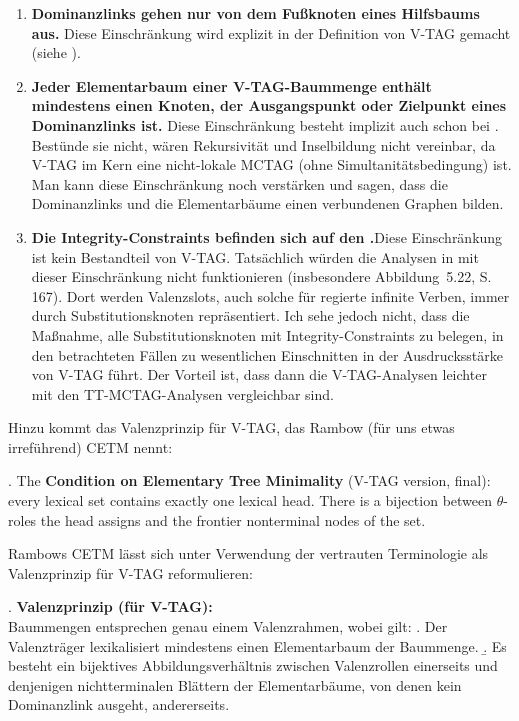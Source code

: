 \begin{enumerate}
  \item {\bf Dominanzlinks gehen nur von dem Fu\ss knoten eines Hilfsbaums aus.} Diese Einschränkung wird explizit in der Definition von V-TAG gemacht (siehe \citealt[Def.~21]{Rambow:94}).
  \item  {\bf Jeder Elementarbaum einer V-TAG-Baummenge enthält mindestens einen Knoten, der Ausgangspunkt oder Zielpunkt eines Dominanzlinks ist.} Diese Einschränkung besteht implizit auch schon bei \cite{Rambow:94}. Bestünde sie nicht, wären  Rekursivität und Inselbildung nicht vereinbar, da V-TAG im Kern eine nicht-lokale MCTAG (ohne Simultanitätsbedingung) ist. Man kann diese Einschränkung noch verstärken und sagen, dass die Dominanzlinks und die Elementarbäume einen verbundenen Graphen bilden.  
  \item {\bf Die Integrity-Constraints befinden sich auf den .}\linebreak Diese Einschränkung ist kein Bestandteil von V-TAG. Tatsächlich würden die Analysen in \cite{Rambow:94} mit dieser Einschränkung nicht funktionieren (insbesondere Abbildung~5.22, S.\,167). Dort werden Valenzslots, auch solche für regierte infinite Verben, immer durch Substitutionsknoten repräsentiert. Ich sehe jedoch nicht, dass die Maßnahme, alle Substitutionsknoten mit Integrity-Constraints zu belegen, in den betrachteten Fällen zu wesentlichen Einschnitten in der Ausdrucksstärke von V-TAG führt. Der Vorteil ist, dass dann die V-TAG-Analysen leichter mit den TT-MCTAG-Analysen vergleichbar sind. 
\end{enumerate}     
Hinzu kommt das Valenzprinzip für V-TAG, das Rambow (für uns etwas irreführend) CETM nennt:    

\ex. The {\bf Condition on Elementary Tree Minimality} (V-TAG version, final): every lexical set contains exactly one lexical head. There is a bijection between $\theta$-roles the head assigns and the frontier nonterminal nodes of the set. \hfill
\citep[149]{Rambow:94} \label{ex-vtag-cetm7}

Rambows CETM lässt sich unter Verwendung der vertrauten Terminologie als Valenzprinzip für V-TAG reformulieren:

\ex. {\bf Valenzprinzip (für V-TAG):} \label{ex-vtag-valenz}\\
Baummengen entsprechen genau einem Valenzrahmen, wobei gilt:
\a. Der Valenzträger lexikalisiert mindestens einen Elementarbaum der Baummenge.
\b. Es besteht ein bijektives Abbildungsverhältnis zwischen Valenzrollen einerseits und denjenigen nichtterminalen Blättern der Elementarbäume, von denen kein Dominanzlink ausgeht, andererseits.

